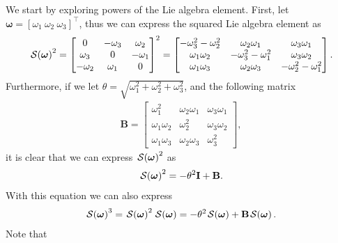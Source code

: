 We start by exploring powers of the Lie algebra element. First, let $\boldsymbol{\omega} = [\omega_1\ \omega_2\ \omega_3]^\top$, thus we can express the squared Lie algebra element as
\begin{align}
    \SL[\boldsymbol{\omega}]^2 = \begin{bmatrix}
        0 & -\omega_3 & \omega_2\\
        \omega_3 & 0 & -\omega_1 \\
        -\omega_2 & \omega_1 & 0
    \end{bmatrix}^2 = 
    \begin{bmatrix}
        -\omega_3^2-\omega_2^2 & \omega_2\omega_1 & \omega_3\omega_1\\
        \omega_1\omega_2 & -\omega_3^2-\omega_1^2 & \omega_3\omega_2 \\
        \omega_1\omega_3 & \omega_2\omega_3 & -\omega_2^2-\omega_1^2
    \end{bmatrix}.
\end{align}
Furthermore, if we let $\theta=\sqrt{\omega_1^2+\omega_2^2+\omega_3^2}$, and the following matrix
\begin{align}
    \mathbf{B} = \begin{bmatrix}
        \omega_1^2 & \omega_2\omega_1 & \omega_3\omega_1\\
        \omega_1\omega_2 & \omega_2^2 & \omega_3\omega_2 \\
        \omega_1\omega_3 & \omega_2\omega_3 & \omega_3^2
    \end{bmatrix},
\end{align}
it is clear that we can express $\SL[\boldsymbol{\omega}]^2$ as
\begin{align}
    \SL[\boldsymbol{\omega}]^2 = -\theta^2\mathbf{I} + \mathbf{B}.
\end{align}
With this equation we can also express
\begin{align}
    \SL[\boldsymbol{\omega}]^3 = \SL[\boldsymbol{\omega}]^2\SL[\boldsymbol{\omega}] = -\theta^2\SL[\boldsymbol{\omega}] + \mathbf{B}\SL[\boldsymbol{\omega}].
\end{align}
Note that
